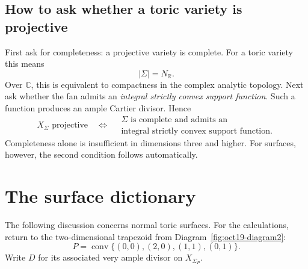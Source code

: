 \documentclass[11pt]{article}
\theoremstyle{definition}
\theoremstyle{remark}
\DeclareMathOperator{\Conv}{conv}
\newcommand{\Sg}{\Sigma}
\newcommand{\bR}{\mathbb{R}}
\newcommand{\bC}{\mathbb{C}}
\begin{document}
\subsection{How to ask whether a toric variety is projective}

First ask for completeness: a projective variety is complete.
For a toric variety this means
\[
    |\Sg|=N_\bR.
\]
Over \(\bC\), this is equivalent to compactness in the complex
analytic topology. Next ask whether the fan admits an
\emph{integral strictly convex support function}. Such a function
produces an ample Cartier divisor. Hence
\[
    X_\Sg\text{ projective}
    \quad\Longleftrightarrow\quad
    \begin{gathered}
        \Sg\text{ is complete and admits an}\\
        \text{integral strictly convex support function}.
    \end{gathered}
\]
Completeness alone is insufficient in dimensions three and higher.
For surfaces, however, the second condition follows automatically.

\section{The surface dictionary}

The following discussion concerns normal toric surfaces. For the
calculations, return to the two-dimensional trapezoid from
Diagram~\ref{fig:oct19-diagram2}:
\[
    P=\Conv\{(0,0),(2,0),(1,1),(0,1)\}.
\]
Write \(D\) for its associated very ample divisor on
\(X_{\Sigma_P}\).
\end{document}
